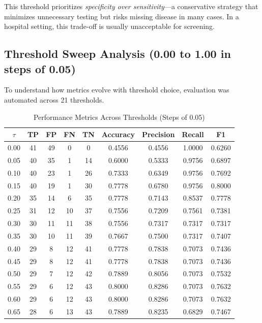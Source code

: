 \documentclass[11pt]{article}
\begin{document}
This threshold prioritizes \textit{specificity over sensitivity}—a conservative strategy that minimizes unnecessary testing but risks missing disease in many cases. In a hospital setting, this trade-off is usually unacceptable for screening.

\subsection{Threshold Sweep Analysis (0.00 to 1.00 in steps of 0.05)}

To understand how metrics evolve with threshold choice, evaluation was automated across 21 thresholds.

\begin{table}[H]
    \centering
    \caption{Performance Metrics Across Thresholds (Steps of 0.05)}
    \small
    \begin{tabular}{ccccccccc}
        \toprule
        $\tau$ & TP & FP & FN & TN & Accuracy & Precision & Recall & F1 \\
        \midrule
        0.00 & 41 & 49 & 0 & 0 & 0.4556 & 0.4556 & 1.0000 & 0.6260 \\
        0.05 & 40 & 35 & 1 & 14 & 0.6000 & 0.5333 & 0.9756 & 0.6897 \\
        0.10 & 40 & 23 & 1 & 26 & 0.7333 & 0.6349 & 0.9756 & 0.7692 \\
        0.15 & 40 & 19 & 1 & 30 & 0.7778 & 0.6780 & 0.9756 & 0.8000 \\
        0.20 & 35 & 14 & 6 & 35 & 0.7778 & 0.7143 & 0.8537 & 0.7778 \\
        0.25 & 31 & 12 & 10 & 37 & 0.7556 & 0.7209 & 0.7561 & 0.7381 \\
        0.30 & 30 & 11 & 11 & 38 & 0.7556 & 0.7317 & 0.7317 & 0.7317 \\
        0.35 & 30 & 10 & 11 & 39 & 0.7667 & 0.7500 & 0.7317 & 0.7407 \\
        0.40 & 29 & 8 & 12 & 41 & 0.7778 & 0.7838 & 0.7073 & 0.7436 \\
        0.45 & 29 & 8 & 12 & 41 & 0.7778 & 0.7838 & 0.7073 & 0.7436 \\
        0.50 & 29 & 7 & 12 & 42 & 0.7889 & 0.8056 & 0.7073 & 0.7532 \\
        0.55 & 29 & 6 & 12 & 43 & 0.8000 & 0.8286 & 0.7073 & 0.7632 \\
        0.60 & 29 & 6 & 12 & 43 & 0.8000 & 0.8286 & 0.7073 & 0.7632 \\
        0.65 & 28 & 6 & 13 & 43 & 0.7889 & 0.8235 & 0.6829 & 0.7467 \\

\end{tabular}
\end{table}
\end{document}
